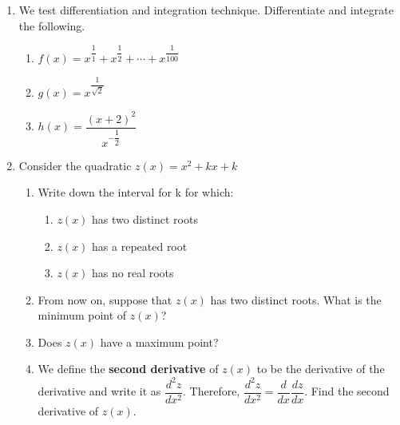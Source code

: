 \documentclass{article}
\begin{document}
\begin{enumerate}
\begin{enumerate}
		\end{enumerate}


	\item We test differentiation and integration technique.  Differentiate and integrate the following.
		\begin{enumerate}
			\item $f(x) = x^{\dfrac{1}{1}} + x^{\dfrac{1}{2}} + \cdots + x^{\dfrac{1}{100}}$
			
			\item $g(x) = x^{\dfrac{1}{\sqrt{2}}}$
			
			\item $h(x) = \dfrac{(x+2)^2}{x^{-\dfrac{1}{2}}}$
			
		\end{enumerate}


	
	
	\item Consider the quadratic $z(x) = x^2 + kx + k$
	\begin{enumerate}
	
		\item Write down the interval for k for which:
			\begin{enumerate}
				\item $z(x)$ has two distinct roots
				\item $z(x)$ has a repeated root
				\item $z(x)$ has no real roots
			\end{enumerate}
		
		\item From now on, suppose that $z(x)$ has two distinct roots.  What is the minimum point of $z(x)$?
		
		\item Does $z(x)$ have a maximum point?
		
		\item We define the \textbf{second derivative} of $z(x)$ to be the derivative of the derivative and write it as $\dfrac{d^2z}{dx^2}$.  Therefore, $\dfrac{d^2z}{dx^2} = \dfrac{d}{dx}{ \dfrac{dz}{dx}}$.  Find the second derivative of $z(x)$.
	\end{enumerate}
	
\end{enumerate}
\end{document}
